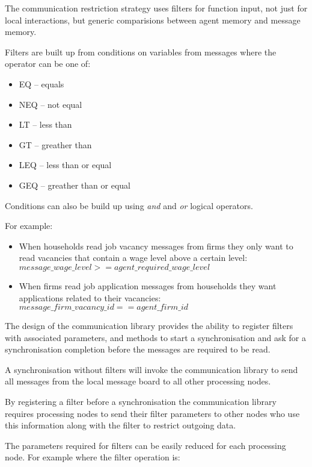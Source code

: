 \documentclass{aamas2009}
\begin{document}
The communication restriction strategy uses filters for function input, not just
for local interactions, but generic comparisions between agent memory
and message memory.

Filters are built up from conditions on variables from messages where the
operator can be one of:

\begin{itemize}
  \item EQ -- equals
  \item NEQ -- not equal
  \item LT -- less than
  \item GT -- greather than
  \item LEQ -- less than or equal
  \item GEQ -- greather than or equal
\end{itemize}

Conditions can also be build up using \textit{and} and \textit{or} logical
operators.

For example:

\begin{itemize}
  \item When households read job vacancy messages from firms they only want to
  read vacancies that contain a wage level above a certain level:\\
$message\_wage\_level >= agent\_required\_wage\_level$
  \item When firms read job application messages from
households they want applications related to their vacancies:\\
$message\_firm\_vacancy\_id == agent\_firm\_id$
\end{itemize}

The design of the communication library provides the ability to register
filters with associated parameters, and methods to start a synchronisation and
ask for a synchronisation completion before the messages are required to be
read.

A synchronisation without filters will invoke the communication library to send
all messages from the local message board to all other processing nodes.

By registering a filter before a synchronisation the communication library
requires processing nodes to send their filter parameters to other nodes who
use this information along with the filter to restrict outgoing data.

The parameters required for filters can be easily reduced for each processing
node. For example where the filter operation is:
\end{document}
